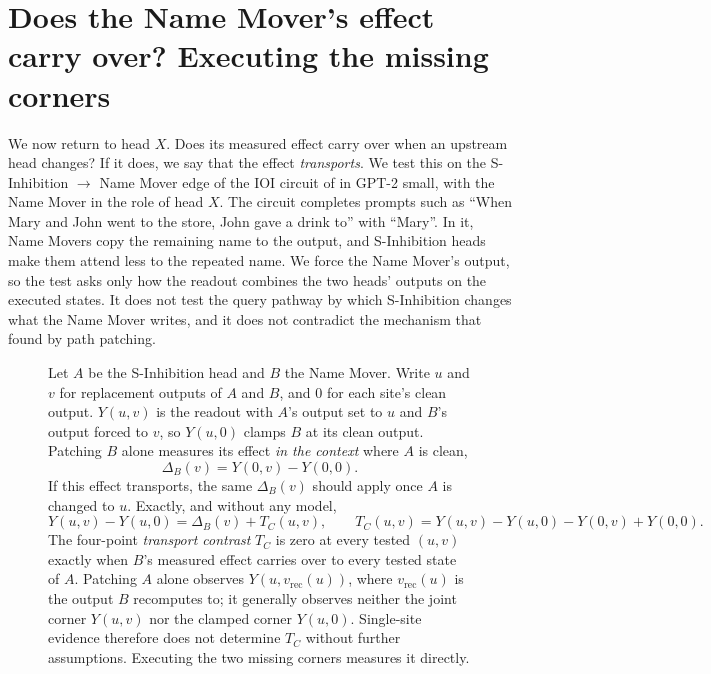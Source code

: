 \documentclass{article}
\theoremstyle{plain}
\theoremstyle{definition}
\begin{document}



\section{Does the Name Mover's effect carry over? Executing the missing corners}
\label{sec:ioi}

We now return to head $X$. Does its measured effect carry over when an upstream head changes? If it does, we say
that the effect \emph{transports}. We test this on the S-Inhibition $\to$ Name Mover edge of the IOI circuit
of \citet{wang2022ioi} in GPT-2 small, with the Name Mover in the role of head $X$. The circuit completes prompts such as ``When Mary and John went to
the store, John gave a drink to'' with ``Mary''. In it, Name Movers copy the remaining name to the output, and
S-Inhibition heads make them attend less to the repeated name. We force the Name Mover's output,
so the test asks only how the readout combines the two heads' outputs on the executed states. It does not test the
query pathway by which S-Inhibition changes what the Name Mover writes, and it does not contradict the mechanism that
\citet{wang2022ioi} found by path patching.

\begin{figure}[t]
\begin{tcolorbox}[title={The transport contrast}]
Let $A$ be the S-Inhibition head and $B$ the Name Mover. Write $u$ and $v$ for replacement outputs of $A$ and $B$, and
$0$ for each site's clean output. $Y(u,v)$ is the readout with $A$'s output set to $u$ and $B$'s output forced to $v$,
so $Y(u,0)$ clamps $B$ at its clean output. Patching $B$ alone measures its effect \emph{in the context} where $A$ is
clean,
\[
  \Delta_B(v)=Y(0,v)-Y(0,0).
\]
If this effect transports, the same $\Delta_B(v)$ should apply once $A$ is changed to $u$. Exactly, and without any
model,
\[
  Y(u,v)-Y(u,0)=\Delta_B(v)+T_C(u,v),\qquad T_C(u,v)=Y(u,v)-Y(u,0)-Y(0,v)+Y(0,0).
\]
The four-point \emph{transport contrast} $T_C$ is zero at every tested $(u,v)$ exactly when $B$'s measured effect
carries over to every tested state of $A$. Patching $A$ alone observes $Y(u,v_{\mathrm{rec}}(u))$, where
$v_{\mathrm{rec}}(u)$ is the output $B$ recomputes to; it generally observes neither the joint corner $Y(u,v)$ nor the
clamped corner $Y(u,0)$. Single-site evidence therefore does not determine $T_C$ without further assumptions.
Executing the two missing corners measures it directly.
\end{tcolorbox}
\end{figure}
\end{document}
